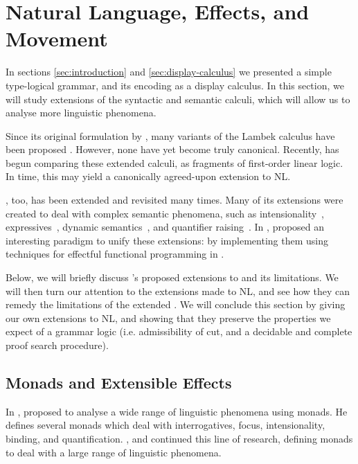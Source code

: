 \documentclass[a4paper]{article}
\begin{document}

%
%
%

\section{Natural Language, Effects, and Movement}

In sections \autoref{sec:introduction} and
\autoref{sec:display-calculus} we presented a simple type-logical
grammar, and its encoding as a display calculus. In this section, we
will study extensions of the syntactic and semantic calculi, which
will allow us to analyse more linguistic phenomena.

Since its original formulation by \citet{lambek1961}, many variants of
the Lambek calculus have been proposed
\citep{steedman1988,moortgat2012,morrill2011,kubota2012,barker2015}.
However, none have yet become truly canonical.
Recently, \citet{moot2015} has begun comparing these extended calculi,
as fragments of first-order linear logic. In time, this may yield a
canonically agreed-upon extension to NL.

\lamET, too, has been extended and revisited many times. Many of its
extensions were created to deal with complex semantic phenomena, such
as intensionality~\citep{winter2009},
expressives~\citep{potts2003,mccready2010,gutzmann2011}, dynamic
semantics~\citep{groenendijk1995}, and quantifier
raising~\citep{barker2015}. 
In \citeyear{shan2002}, \citeauthor{shan2002} proposed an interesting
paradigm to unify these extensions: by implementing them using
techniques for effectful functional programming in \lamET.

Below, we will briefly discuss \citeauthor{shan2002}'s proposed
extensions to \lamET and its limitations. We will then turn our
attention to the extensions made to NL, and see how they can remedy
the limitations of the extended \lamET. We will conclude this section
by giving our own extensions to NL, and showing that they preserve the
properties we expect of a grammar logic (i.e. admissibility of cut,
and a decidable and complete proof search procedure).

\subsection{Monads and Extensible Effects}
In \citeyear{shan2002}, \citeauthor{shan2002} proposed to analyse a
wide range of linguistic phenomena using monads. He defines several
monads which deal with interrogatives, focus, intensionality, binding,
and quantification. \citet{bumford2013}, \citet{charlow2014} and
\citet{barker2015} continued this line of research, defining monads to
deal with a large range of linguistic phenomena.
\end{document}
